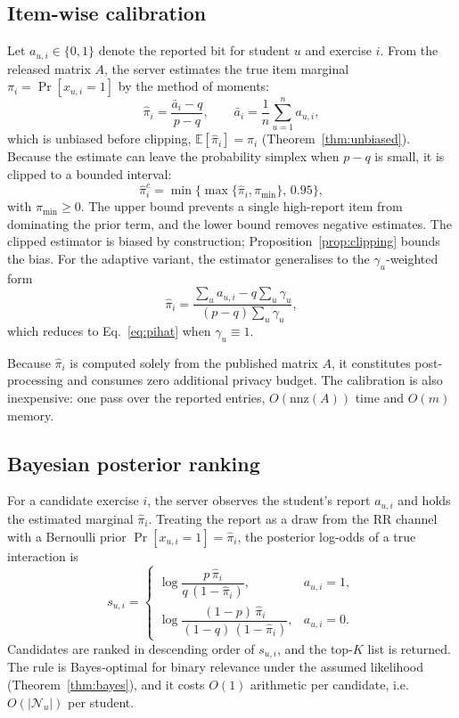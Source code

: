 \documentclass[pdflatex,sn-basic,Numbered]{sn-jnl}
\theoremstyle{plain}
\theoremstyle{remark}
\theoremstyle{definition}
\newcommand{\Prob}{\Pr}
\newcommand{\E}{\mathbb{E}}
\begin{document}
\subsection{Item-wise calibration}\label{sec:calibration}

Let $a_{u,i}\in\{0,1\}$ denote the reported bit for student $u$ and exercise $i$. From the released matrix $A$, the server estimates the true item marginal $\pi_i=\Prob[x_{u,i}=1]$ by the method of moments:
\begin{equation}\label{eq:pihat}
\hat\pi_i=\frac{\bar a_i-q}{p-q},\qquad \bar a_i=\frac{1}{n}\sum_{u=1}^{n}a_{u,i},
\end{equation}
which is unbiased before clipping, $\E[\hat\pi_i]=\pi_i$ (Theorem~\ref{thm:unbiased}). Because the estimate can leave the probability simplex when $p-q$ is small, it is clipped to a bounded interval:
\begin{equation}\label{eq:clip}
\hat\pi_i^{c}=\min\{\max\{\hat\pi_i,\pi_{\min}\},\,0.95\},
\end{equation}
with $\pi_{\min}\ge 0$. The upper bound prevents a single high-report item from dominating the prior term, and the lower bound removes negative estimates. The clipped estimator is biased by construction; Proposition~\ref{prop:clipping} bounds the bias. For the adaptive variant, the estimator generalises to the $\gamma_u$-weighted form
\begin{equation}\label{eq:pihat-adaptive}
\hat\pi_i=\frac{\sum_u a_{u,i}-q\sum_u\gamma_u}{(p-q)\sum_u\gamma_u},
\end{equation}
which reduces to Eq.~\eqref{eq:pihat} when $\gamma_u\equiv1$.

Because $\hat\pi_i$ is computed solely from the published matrix $A$, it constitutes post-processing and consumes zero additional privacy budget. The calibration is also inexpensive: one pass over the reported entries, $O(\mathrm{nnz}(A))$ time and $O(m)$ memory.

\subsection{Bayesian posterior ranking}\label{sec:ranking}

For a candidate exercise $i$, the server observes the student's report $a_{u,i}$ and holds the estimated marginal $\hat\pi_i$. Treating the report as a draw from the RR channel with a Bernoulli prior $\Prob[x_{u,i}=1]=\hat\pi_i$, the posterior log-odds of a true interaction is
\begin{equation}\label{eq:score}
s_{u,i}=\begin{cases}
\log\dfrac{p\,\hat\pi_i}{q\,(1-\hat\pi_i)}, & a_{u,i}=1,\\[3mm]
\log\dfrac{(1-p)\,\hat\pi_i}{(1-q)\,(1-\hat\pi_i)}, & a_{u,i}=0.
\end{cases}
\end{equation}
Candidates are ranked in descending order of $s_{u,i}$, and the top-$K$ list is returned. The rule is Bayes-optimal for binary relevance under the assumed likelihood (Theorem~\ref{thm:bayes}), and it costs $O(1)$ arithmetic per candidate, i.e.\ $O(|\mathcal{N}_u|)$ per student.
\end{document}
